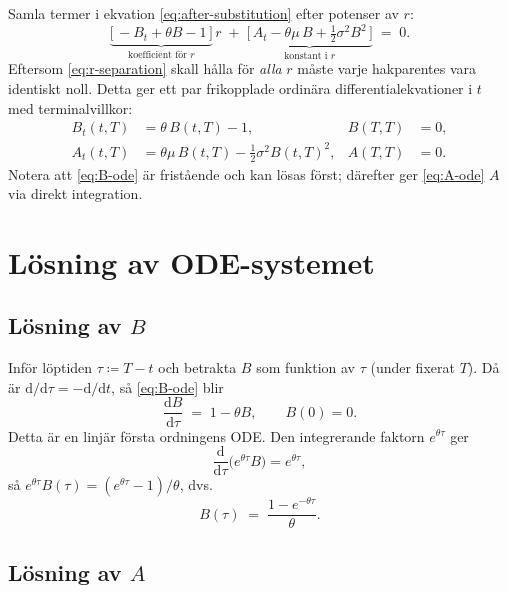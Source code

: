 \documentclass[11pt,a4paper]{article}
\newcommand{\dd}{\mathrm{d}}
\theoremstyle{plain}
\theoremstyle{definition}
\theoremstyle{remark}
\begin{document}
Samla termer i ekvation \eqref{eq:after-substitution} efter potenser av $r$:
\begin{equation}
    \underbrace{\bigl[\,-B_t + \theta B - 1\,\bigr]}_{\text{koefficient för }r}\, r \;+\; \underbrace{\bigl[\,A_t - \theta\mu\,B + \tfrac12\sigma^2 B^2\,\bigr]}_{\text{konstant i }r} \;=\; 0.
    \label{eq:r-separation}
\end{equation}
Eftersom \eqref{eq:r-separation} skall hålla för \emph{alla} $r$ måste varje hakparentes vara identiskt noll. Detta ger ett par frikopplade ordinära differentialekvationer i $t$ med terminalvillkor:
\begin{align}
    B_t(t,T) &= \theta\,B(t,T) - 1, & B(T,T) &= 0, \label{eq:B-ode}\\
    A_t(t,T) &= \theta\mu\,B(t,T) - \tfrac12\sigma^2 B(t,T)^2, & A(T,T) &= 0. \label{eq:A-ode}
\end{align}
Notera att \eqref{eq:B-ode} är fristående och kan lösas först; därefter ger \eqref{eq:A-ode} $A$ via direkt integration.

\section{Lösning av ODE-systemet}

\subsection*{Lösning av $B$}

Inför löptiden $\tau \coloneqq T - t$ och betrakta $B$ som funktion av $\tau$ (under fixerat $T$). Då är $\dd/\dd\tau = -\dd/\dd t$, så \eqref{eq:B-ode} blir
\begin{equation}
    \frac{\dd B}{\dd\tau} \;=\; 1 - \theta B, \qquad B(0) = 0.
    \label{eq:B-tau}
\end{equation}
Detta är en linjär första ordningens ODE. Den integrerande faktorn $e^{\theta\tau}$ ger
\[
    \frac{\dd}{\dd\tau}\bigl(e^{\theta\tau}B\bigr) = e^{\theta\tau},
\]
så $e^{\theta\tau}B(\tau) = (e^{\theta\tau} - 1)/\theta$, dvs.
\begin{equation}
    \boxed{\,B(\tau) \;=\; \dfrac{1 - e^{-\theta\tau}}{\theta}.\,}
    \label{eq:B-solution}
\end{equation}

\subsection*{Lösning av $A$}
\end{document}
